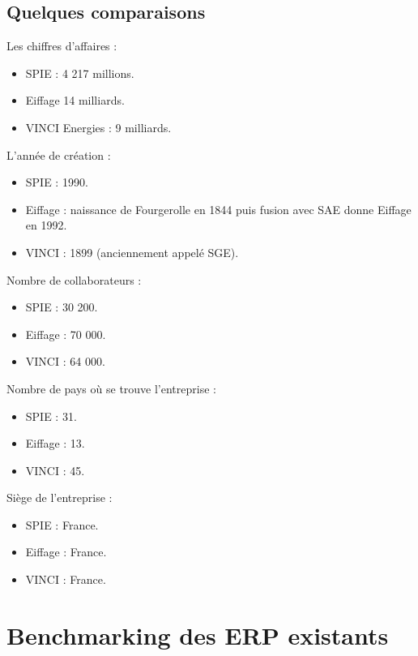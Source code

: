 	\subsection{Quelques comparaisons}
        Les chiffres d'affaires :
        \begin {itemize}
        	\item SPIE : 4 217 millions.
        	\item Eiffage 14 milliards.
        	\item VINCI Energies : 9 milliards.
        \end{itemize}

        L'année de création :
        \begin {itemize}
        	\item SPIE : 1990.
        	\item Eiffage : naissance de Fourgerolle en 1844 puis fusion avec SAE donne Eiffage en 1992.
        	\item VINCI : 1899 (anciennement appelé SGE).
        \end{itemize}

        Nombre de collaborateurs :
        \begin {itemize}
        	\item SPIE : 30 200.
        	\item Eiffage : 70 000.
        	\item VINCI : 64 000.
        \end{itemize}

        Nombre de pays où se trouve l'entreprise :
        \begin {itemize}
        	\item SPIE : 31.
        	\item Eiffage : 13.
        	\item VINCI : 45.
        \end{itemize}

        Siège de l'entreprise :
        \begin {itemize}
        	\item SPIE : France.
        	\item Eiffage : France.
        	\item VINCI : France.
        \end{itemize}


\section{Benchmarking des ERP existants}

